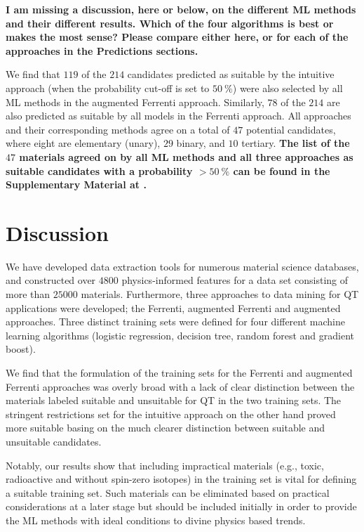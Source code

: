 \documentclass[superscriptaddress,unsortedaddress,
 amsmath,amssymb,
 aps,
]{revtex4-2}
\begin{document}
\textbf{I am missing a discussion, here or below, on the different ML methods and their different results. Which of the four algorithms is best or makes the most sense? Please compare either here, or for each of the approaches in the Predictions sections.} 

We find that $119$ of the $214$ candidates predicted as suitable by the intuitive approach (when the probability cut-off is set to $50 \ \%$) were also selected by all ML methods in the augmented Ferrenti approach. 
Similarly, $78$ of the $214$ are also predicted as suitable by all models in the Ferrenti approach. All approaches and their corresponding methods agree on a total of $47$ potential candidates, where eight are elementary (unary), $29$ binary, and $10$ tertiary.
\textbf{The list of the $47$ materials agreed on by all ML methods and all three approaches as suitable candidates with a probability $> 50 \ \%$ can be found in the Supplementary Material at \cite{supplementary}.} 
    

\section*{Discussion} 
We have developed data extraction tools for numerous material science databases, and constructed over $4800$ physics-informed features for a data set consisting of more than $25000$ materials. Furthermore, three approaches to data mining for QT applications were developed; the Ferrenti, augmented Ferrenti and augmented approaches. 
Three distinct training sets were defined for four different machine learning algorithms (logistic regression, decision tree, random forest and gradient boost). 

We find that the formulation of the training sets for the Ferrenti and augmented Ferrenti approaches was overly broad with a lack of clear distinction between the materials labeled suitable and unsuitable for QT in the two training sets. The stringent restrictions set for the intuitive approach on the other hand proved more suitable basing on the much clearer distinction between suitable and unsuitable candidates. 

Notably, our results show that including impractical materials (e.g., toxic, radioactive and without spin-zero isotopes) in the training set is vital for defining a suitable training set. 
Such materials can be eliminated based on practical considerations at a later stage but should be included initially in order to provide the ML methods with ideal conditions to divine physics based trends. 
\end{document}
